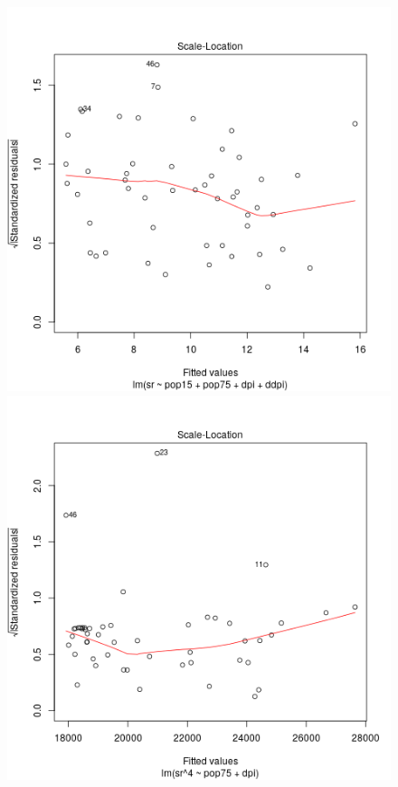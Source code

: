 \begin{figure}[p]
\begin{center}
    \includegraphics[scale=0.4]{plot13.png} \hspace*{2cm} \includegraphics[scale=0.4]{plot23.png} \\
  \end{center}
\end{figure}

